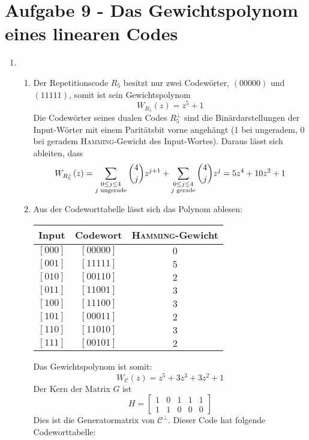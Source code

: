\section*{Aufgabe 9 - Das Gewichtspolynom eines linearen Codes}
\begin{enumerate}
	\item 
		\begin{enumerate}
		\item
		Der Repetitionscode $R_5$ besitzt nur zwei Codewörter, $(0 0 0
		0 0)$ und $(1 1 1 1 1)$, somit ist sein Gewichtspolynom
		\[ W_{R_5}(z) = z^5 + 1 \]
		Die Codewörter seines dualen Codes $R_5^{\bot}$ sind die
		Binärdarstellungen der Input-Wörter mit einem Paritätsbit vorne
		angehängt (1 bei ungeradem, 0 bei geradem
		\textsc{Hamming}-Gewicht des Input-Wortes). Daraus lässt sich
		ableiten, dass
		\[ W_{R_5^{\bot}}(z) = \sum_{\substack{0\leq j\leq 4\\ j
		\textnormal{ ungerade}}}\binom{4}{j}z^{j+1} +
		\sum_{\substack{0\leq j\leq 4\\ j \textnormal{
		  gerade}}}\binom{4}{j}z^j = 5z^4 + 10z^2 + 1 \]
		\item
		Aus der Codeworttabelle lässt sich das Polynom ablesen:

		\begin{center}
		\begin{tabular}{c|c|c}
		Input & Codewort & \textsc{Hamming}-Gewicht \\
		\hline
		$[0 0 0]$ & $[0 0 0 0 0]$ & $0$ \\
		$[0 0 1]$ & $[1 1 1 1 1]$ & $5$ \\
		$[0 1 0]$ & $[0 0 1 1 0]$ & $2$ \\
		$[0 1 1]$ & $[1 1 0 0 1]$ & $3$ \\
		$[1 0 0]$ & $[1 1 1 0 0]$ & $3$ \\
		$[1 0 1]$ & $[0 0 0 1 1]$ & $2$ \\
		$[1 1 0]$ & $[1 1 0 1 0]$ & $3$ \\
		$[1 1 1]$ & $[0 0 1 0 1]$ & $2$
		\end{tabular}
		\end{center}

		Das Gewichtspolynom ist somit:
		\[ W_{\mathcal{C}}(z) = z^5 + 3z^3 + 3z^2 + 1 \]
		Der Kern der Matrix $G$ ist
		\[ H=\begin{bmatrix}1&0&1&1&1\\1&1&0&0&0\end{bmatrix} \]
		Dies ist die Generatormatrix von $\mathcal{C}^{\bot}$. Dieser
		Code hat folgende Codeworttabelle:


\end{enumerate}
\end{enumerate}
